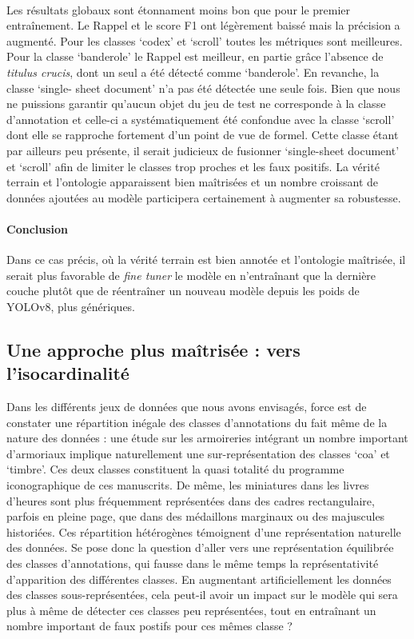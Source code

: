 \documentclass[12pt,twoside]{book}
\begin{document}
\paragraph{}
Les résultats globaux sont étonnament moins bon que pour le premier entraînement. Le Rappel et le score F1 ont légèrement baissé mais la précision a augmenté. Pour les classes ‘codex’ et ‘scroll’ toutes les métriques sont meilleures. Pour la classe ‘banderole’ le Rappel est meilleur, en partie grâce l’absence de \textit{titulus crucis}, dont un seul a été détecté comme ‘banderole’. En revanche, la classe ‘single- sheet document’ n’a pas été détectée une seule fois.  Bien que nous ne puissions garantir qu’aucun objet du jeu de test ne corresponde à la classe d’annotation et celle-ci a systématiquement été confondue avec la classe ‘scroll’ dont elle se rapproche fortement d’un point de vue de formel. Cette classe étant par ailleurs peu présente, il serait judicieux de fusionner ‘single-sheet document’ et ‘scroll’ afin de limiter le classes trop proches et les faux positifs. La vérité terrain et l’ontologie apparaissent bien maîtrisées et un nombre croissant de données ajoutées au modèle participera certainement à augmenter sa robustesse. 

\paragraph{Conclusion}Dans ce cas précis, où la vérité terrain est bien annotée et l’ontologie maîtrisée, il serait plus favorable de \textit{fine tuner} le modèle en n’entraînant que la dernière couche plutôt que de réentraîner un nouveau modèle depuis les poids de YOLOv8, plus génériques.

\subsection{Une approche plus maîtrisée : vers l’isocardinalité }

Dans les différents jeux de données que nous avons envisagés, force est de constater une répartition inégale des classes d’annotations du fait même de la nature des données : une étude sur les armoireries intégrant un nombre important d’armoriaux implique naturellement une sur-représentation des classes ‘coa’ et ‘timbre’. Ces deux classes constituent  la quasi totalité du programme iconographique de ces manuscrits. De même, les miniatures dans les livres d’heures sont plus fréquemment représentées dans des cadres rectangulaire, parfois en pleine page, que dans des médaillons marginaux ou  des majuscules historiées. Ces répartition hétérogènes témoignent d’une représentation naturelle des données.  Se pose donc la question d’aller vers une représentation équilibrée des classes d’annotations, qui fausse dans le même temps la représentativité d’apparition des différentes classes. En augmentant artificiellement les données des classes sous-représentées, cela peut-il avoir un impact sur le modèle qui sera plus à même de détecter ces classes peu représentées, tout en entraînant un nombre important de faux postifs pour ces mêmes classe ? \\
\end{document}
